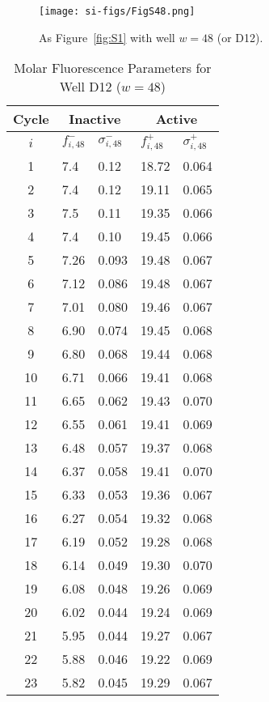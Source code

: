                 \begin{figure}
                    \centering
                    \texttt{[image: si-figs/FigS48.png]}
                    \caption{
                        As Figure~\ref{fig:S1} with well $w=48$ (or D12).
                    }
                \end{figure}
                \clearpage
    \begin{table}
        \caption{Molar Fluorescence Parameters for Well D12 ($w=48$)}
        \centering
        \begin{tabular}{c|ll|ll}
            Cycle & \multicolumn{2}{c|}{Inactive} & \multicolumn{2}{c}{Active} \\
            \hline
            $i$ & $f_{i,48}^{-}$ & $\sigma_{i,48}^{-}$ &  $f_{i,48}^{+}$ & $\sigma_{i,48}^{+}$ \\
            \hline
    1 & 7.4 & 0.12 & 18.72 & 0.064 \\
2 & 7.4 & 0.12 & 19.11 & 0.065 \\
3 & 7.5 & 0.11 & 19.35 & 0.066 \\
4 & 7.4 & 0.10 & 19.45 & 0.066 \\
5 & 7.26 & 0.093 & 19.48 & 0.067 \\
6 & 7.12 & 0.086 & 19.48 & 0.067 \\
7 & 7.01 & 0.080 & 19.46 & 0.067 \\
8 & 6.90 & 0.074 & 19.45 & 0.068 \\
9 & 6.80 & 0.068 & 19.44 & 0.068 \\
10 & 6.71 & 0.066 & 19.41 & 0.068 \\
11 & 6.65 & 0.062 & 19.43 & 0.070 \\
12 & 6.55 & 0.061 & 19.41 & 0.069 \\
13 & 6.48 & 0.057 & 19.37 & 0.068 \\
14 & 6.37 & 0.058 & 19.41 & 0.070 \\
15 & 6.33 & 0.053 & 19.36 & 0.067 \\
16 & 6.27 & 0.054 & 19.32 & 0.068 \\
17 & 6.19 & 0.052 & 19.28 & 0.068 \\
18 & 6.14 & 0.049 & 19.30 & 0.070 \\
19 & 6.08 & 0.048 & 19.26 & 0.069 \\
20 & 6.02 & 0.044 & 19.24 & 0.069 \\
21 & 5.95 & 0.044 & 19.27 & 0.067 \\
22 & 5.88 & 0.046 & 19.22 & 0.069 \\
23 & 5.82 & 0.045 & 19.29 & 0.067 \\

\end{tabular}
\end{table}
